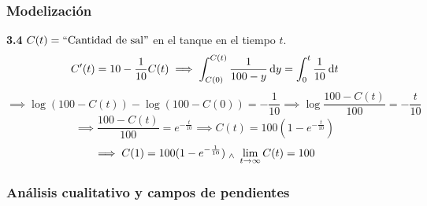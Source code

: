 \subsubsection{Modelización}

\textbf{3.4} $C(t)=\text{``Cantidad de sal''}$ en el tanque en el tiempo $t$.
\[C'(t)=10-\frac{1}{10}C(t) \implies \int_{C(0)}^{C(t)} \frac{1}{100-y}\odif{y} = \int_{0}^{t}\frac{1}{10}\odif{t}\]
\[\implies \log{(100-C(t))} - \log{(100-C(0))}=-\frac{1}{10}\implies \log{\frac{100-C(t)}{100}}=-\frac{t}{10}\]
\[\implies \frac{100-C(t)}{100}=e^{-\frac{t}{10}}\implies C(t)=100(1-e^{-\frac{t}{10}})\]
\[\implies C(1)=100(1-e^{-\frac{1}{10}}) \; _{\wedge} \; \lim_{t\to \infty} C(t) = 100\]

\subsubsection{Análisis cualitativo y campos de pendientes}

